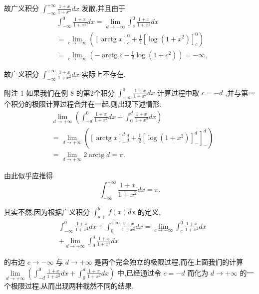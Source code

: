 故广义积分 ${\int }_{-\infty }^{+\infty }\frac{1 + x}{1 + {x}^{2}}{dx}$ 发散,并且由于
\begin{align*}
	&{\int }_{-\infty }^{0}\frac{1 + x}{1 + {x}^{2}}{dx} = \mathop{\lim }\limits_{{d \rightarrow   - \infty }}{\int }_{c}^{0}\frac{1 + x}{1 + {x}^{2}}{dx}\\
	&= \mathop{\lim }\limits_{{c \rightarrow   - \infty }}\left( {{\left\lbrack  \operatorname{arctg}x\right\rbrack  }_{c}^{0} + \frac{1}{2}{\left\lbrack  \log \left( 1 + {x}^{2}\right) \right\rbrack  }_{c}^{0}}\right)\\
	&= \mathop{\lim }\limits_{{c \rightarrow   - \infty }}\left( {-\operatorname{arctg}c - \frac{1}{2}\log \left( {1 + {c}^{2}}\right) }\right)  =  - \infty ,
\end{align*}

故广义积分 ${\int }_{-\infty }^{+\infty }\frac{1 + x}{1 + {x}^{2}}{dx}$ 实际上不存在.

附注 1 如果我们在例 8 的第2个积分 ${\int }_{-\infty }^{0}\frac{1 + x}{1 + {x}^{2}}{dx}$ 计算过程中取 $c =  - d$ ,并与第一个积分的极限计算过程合并在一起,则出现下述情形:
\begin{align*}
	&\mathop{\lim }\limits_{{d \rightarrow   + \infty }}\left( {{\int }_{-d}^{0}\frac{1 + x}{1 + {x}^{2}}{dx} + {\int }_{0}^{d}\frac{1 + x}{1 + {x}^{2}}{dx}}\right)\\
	&= \mathop{\lim }\limits_{{d \rightarrow   + \infty }}\left( {{\left\lbrack  \operatorname{arctg}x\right\rbrack  }_{ - }^{d}{\left. {}_{d}^{d} + \frac{1}{2}{\left\lbrack  \log \left( 1 + {x}^{2}\right) \right\rbrack  }_{ - }^{d}\right\rbrack  }_{ - }^{d}}\right)\\
	&= \mathop{\lim }\limits_{{d \rightarrow   + \infty }}2\operatorname{arctg}d = \pi .
\end{align*}

由此似乎应推得
$${\int }_{-\infty }^{+\infty }\frac{1 + x}{1 + {x}^{2}}{dx} = \pi .$$

其实不然,因为根据广义积分 ${\int }_{a + }^{{b}^{ - }}f\left( x\right) {dx}$ 的定义,
\begin{align*}
	&{\int }_{-\infty }^{0}\frac{1 + x}{1 + {x}^{2}}{dx} + {\int }_{0}^{+\infty }\frac{1 + x}{1 + {x}^{2}}{dx} = \mathop{\lim }\limits_{{c \rightarrow   - \infty }}{\int }_{c}^{0}\frac{1 + x}{1 + {x}^{2}}{dx}\\
	&+ \mathop{\lim }\limits_{{d \rightarrow   + \infty }}{\int }_{0}^{d}\frac{1 + x}{1 + {x}^{2}}{dx}
\end{align*}

的右边 $c \rightarrow   - \infty$ 与 $d \rightarrow   + \infty$ 是两个完全独立的极限过程,而在上面我们的计算 $\mathop{\lim }\limits_{{d \rightarrow   + \infty }}\left( {{\int }_{-d}^{0}\frac{1 + x}{1 + {x}^{2}}{dx} + {\int }_{0}^{d}\frac{1 + x}{1 + {x}^{2}}{dx}}\right)$ 中,已经通过令 $c =  - d$ 而化为 $d \rightarrow   + \infty$ 的一个极限过程,从而出现两种截然不同的结果.

